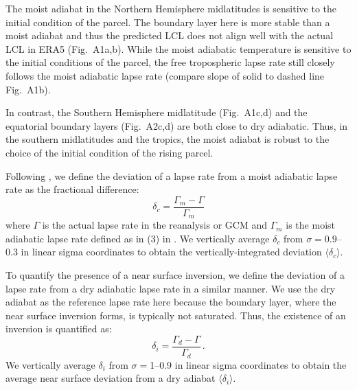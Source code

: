 \documentclass{ametsocV5}
\begin{document}
The moist adiabat in the Northern Hemisphere midlatitudes is sensitive to the initial condition of the parcel. The boundary layer here is more stable than a moist adiabat and thus the predicted LCL does not align well with the actual LCL in ERA5 (Fig.~A1a,b). While the moist adiabatic temperature is sensitive to the initial conditions of the parcel, the free tropospheric lapse rate still closely follows the moist adiabatic lapse rate (compare slope of solid to dashed line Fig.~A1b).

In contrast, the Southern Hemisphere midlatitude (Fig.~A1c,d) and the equatorial boundary layers (Fig.~A2c,d) are both close to dry adiabatic. Thus, in the southern midlatitudes and the tropics, the moist adiabat is robust to the choice of the initial condition of the rising parcel.

\appendix[B]

Following \cite{stone1979}, we define the deviation of a lapse rate from a moist adiabatic lapse rate as the fractional difference:
  \begin{equation}
    \delta_{c} = \frac{\Gamma_{m}-\Gamma}{\Gamma_{m}}
  \end{equation}
where $\Gamma$ is the actual lapse rate in the reanalysis or GCM and $\Gamma_m$ is the moist adiabatic lapse rate defined as in (3) in \cite{stone1979}. We vertically average \(\delta_{c}\) from $\sigma=0.9$--0.3 in linear sigma coordinates to obtain the vertically-integrated deviation \(\langle \delta_{c} \rangle\).

To quantify the presence of a near surface inversion, we define the deviation of a lapse rate from a dry adiabatic lapse rate in a similar manner. We use the dry adiabat as the reference lapse rate here because the boundary layer, where the near surface inversion forms, is typically not saturated. Thus, the existence of an inversion is quantified as:
  \begin{equation}
    \delta_{i} = \frac{\Gamma_{d}-\Gamma}{\Gamma_{d}}\, .
  \end{equation}
We vertically average \(\delta_{i}\) from $\sigma=$1--0.9 in linear sigma coordinates to obtain the average near surface deviation from a dry adiabat \(\langle \delta_{i} \rangle\).

\end{document}
